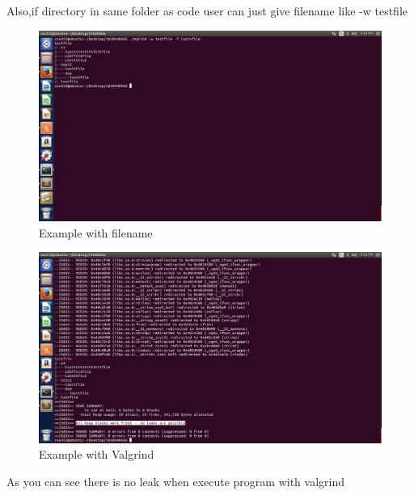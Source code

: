 \documentclass{article}
\begin{document}
Also,if directory in same folder as code user can just give filename like
-w testfile
\begin{figure}[h!]
\centering
\includegraphics[scale=0.3]{example-run2.png}
\caption{Example with filename}
\label{fig:example-run1.png}
\end{figure}


\begin{figure}[h!]
\centering
\includegraphics[scale=0.3]{example-run3.png}
\caption{Example with Valgrind}
\label{fig:example-run3.png}
\end{figure}

As you can see there is no leak when execute program with valgrind
\end{document}
